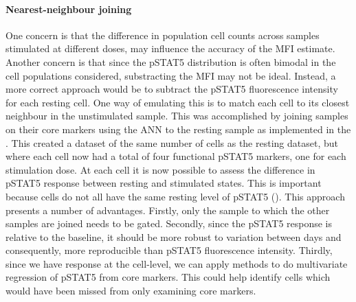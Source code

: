 \paragraph{\label{paragraph:ANN} Nearest-neighbour joining}
One concern is that the difference in population cell counts across samples stimulated at different doses, may influence the accuracy of the MFI estimate.
Another concern is that since the pSTAT5 distribution is often bimodal in the cell populations considered, substracting the MFI may not be ideal.
Instead, a more correct approach would be to subtract the pSTAT5 fluorescence intensity for each resting cell.
One way of emulating this is to match each cell to its closest neighbour in the unstimulated sample.  
This was accomplished by joining samples on their core markers using the \gls{ANN} to the resting sample \citep{Jones:2011ez}
as implemented in the .
This created a dataset of the same number of cells as the resting dataset, but where each cell now had a total of four functional pSTAT5 markers,
one for each stimulation dose.
At each cell it is now possible to assess the difference in pSTAT5 response between resting and stimulated states.
This is important because cells do not all have the same resting level of pSTAT5 ().
This approach presents a number of advantages.
Firstly, only the sample to which the other samples are joined needs to be gated.
Secondly, since the pSTAT5 response is relative to the baseline, it should be more robust to variation between days
and consequently, more reproducible than pSTAT5 fluorescence intensity.
Thirdly, since we have response at the cell-level, we can apply methods
to do multivariate regression of pSTAT5 from core markers.
This could help identify cells which would have been missed from only examining core markers.
